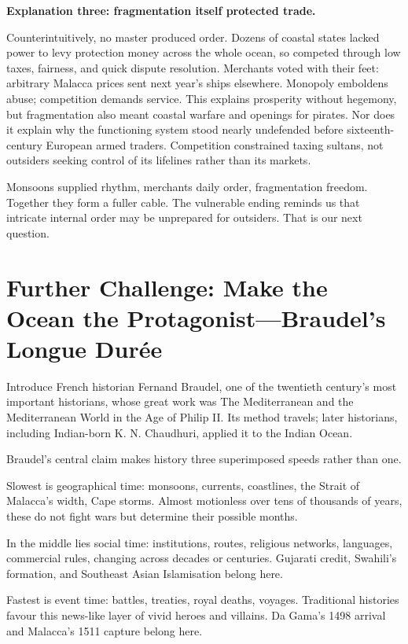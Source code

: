 \textbf{Explanation three: fragmentation itself protected trade.}

Counterintuitively, no master produced order. Dozens of coastal states lacked power to levy protection money across the whole ocean, so competed through low taxes, fairness, and quick dispute resolution. Merchants voted with their feet: arbitrary Malacca prices sent next year's ships elsewhere. Monopoly emboldens abuse; competition demands service. This explains prosperity without hegemony, but fragmentation also meant coastal warfare and openings for pirates. Nor does it explain why the functioning system stood nearly undefended before sixteenth-century European armed traders. Competition constrained taxing sultans, not outsiders seeking control of its lifelines rather than its markets.

Monsoons supplied rhythm, merchants daily order, fragmentation freedom. Together they form a fuller cable. The vulnerable ending reminds us that intricate internal order may be unprepared for outsiders. That is our next question.

\section[Further Challenge: Braudel's Longue Durée]{Further Challenge: Make the Ocean the Protagonist---Braudel's Longue Durée}
Introduce French historian Fernand Braudel, one of the twentieth century's most important historians, whose great work was The Mediterranean and the Mediterranean World in the Age of Philip II. Its method travels; later historians, including Indian-born K. N. Chaudhuri, applied it to the Indian Ocean.

Braudel's central claim makes history three superimposed speeds rather than one.

Slowest is geographical time: monsoons, currents, coastlines, the Strait of Malacca's width, Cape storms. Almost motionless over tens of thousands of years, these do not fight wars but determine their possible months.

In the middle lies social time: institutions, routes, religious networks, languages, commercial rules, changing across decades or centuries. Gujarati credit, Swahili's formation, and Southeast Asian Islamisation belong here.

Fastest is event time: battles, treaties, royal deaths, voyages. Traditional histories favour this news-like layer of vivid heroes and villains. Da Gama's 1498 arrival and Malacca's 1511 capture belong here.

